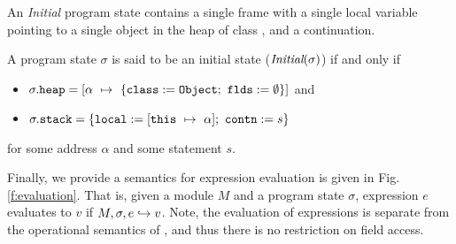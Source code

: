 An \emph{Initial} program state contains a single frame 
with a single local variable  pointing to a single object 
in the heap of class , and a continuation.
\begin{definition}
\label{def:initial}
A program state $\sigma$ is said to be an initial state ($\textit{Initial}(\sigma)$)
if and only if
\begin{itemize}
\item
$\sigma.\prg{heap} = [\alpha\ \mapsto\ \{\prg{class}:=\prg{Object};\ \prg{flds}:=\emptyset\}]$ and
\item
$\sigma.\mbox{\normalfont{\texttt{stack}}} = \{\mbox{\normalfont{\texttt{local}}}:=[\mbox{\normalfont{\texttt{this}}}\ \mapsto\ \alpha];\ \mbox{\normalfont{\texttt{contn}}}:= s\}$
\end{itemize} 
for some address $\alpha$ and some statement $s$.
\end{definition}



Finally, we provide a semantics for expression evaluation is given in Fig. \ref{f:evaluation}. 
That is, given a module $M$ and a program state $\sigma$, expression $e$ evaluates to $v$
if $M, \sigma, e \hookrightarrow v$. Note, the evaluation of expressions is separate from the operational
semantics of \LangOO, and thus there is no restriction on field access.



\newpage
